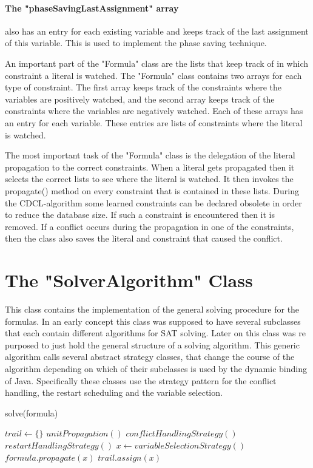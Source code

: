 \paragraph{The "phaseSavingLastAssignment" array} also has an entry for each existing variable and keeps track of the last assignment of this variable. This is used to implement the phase saving technique.
\par
An important part of the "Formula" class are the lists that keep track of in which constraint a literal is watched. The "Formula" class contains two arrays for each type of constraint. The first array keeps track of the constraints where the variables are positively watched, and the second array keeps track of the constraints where the variables are negatively watched. Each of these arrays has an entry for each variable. These entries are lists of constraints where the literal is watched.
\par
The most important task of the "Formula" class is the delegation of the literal propagation to the correct constraints. When a literal gets propagated then it selects the correct lists to see where the literal is watched. It then invokes the propagate() method on every constraint that is contained in these lists. During the CDCL-algorithm some learned constraints can be declared obsolete in order to reduce the database size. If such a constraint is encountered then it is removed. If a conflict occurs during the propagation in one of the constraints, then the class also saves the literal and constraint that caused the conflict.

\section{The "SolverAlgorithm" Class}

This class contains the implementation of the general solving procedure for the formulas. In an early concept this class was supposed to have several subclasses that each contain different algorithms for SAT solving. Later on this class was re purposed to just hold the general structure of a solving algorithm. This generic algorithm calls several abstract strategy classes, that change the course of the algorithm depending on which of their subclasses is used by the dynamic binding of Java. Specifically these classes use the strategy pattern for the conflict handling, the restart scheduling and the variable selection.

\begin{algorithm}
\caption{solve(formula)}\label{alg:cap}
\begin{algorithmic}
\State $trail \gets \{\}$
	\State $unitPropagation()$
	\State $conflictHandlingStrategy()$
	\State $restartHandlingStrategy()$
\Else
    \State $x \gets variableSelectionStrategy()$
    \State $formula.propagate(x)$
    \State $trail.assign(x)$
\EndIf
\EndWhile
\end{algorithmic}
\end{algorithm}

